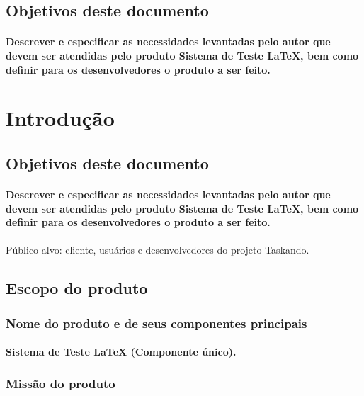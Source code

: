 \documentclass{article}
\begin{document}
	\subsection{Objetivos deste documento}
		\paragraph{Descrever e especificar as necessidades levantadas pelo autor que devem ser atendidas pelo produto Sistema de Teste LaTeX, bem como definir para os desenvolvedores o produto a ser feito.}


\newpage

\section{Introdução}
	\subsection{Objetivos deste documento}
		\paragraph{Descrever e especificar as necessidades levantadas pelo autor que devem ser atendidas pelo produto Sistema de Teste LaTeX, bem como definir para os desenvolvedores o produto a ser feito.}
\paragraph{}Público-alvo: cliente, usuários e desenvolvedores do projeto Taskando.
	\subsection{Escopo do produto}
		\subsubsection{Nome do produto e de seus componentes principais}
			\paragraph{Sistema de Teste LaTeX (Componente único). }
		\subsubsection{Missão do produto}
\end{document}
